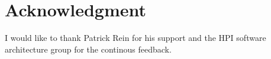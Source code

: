 \documentclass[10pt, conference]{IEEEtran}
\begin{document}




\section*{Acknowledgment}
I would like to thank Patrick Rein for his support and the HPI software architecture group for the continous feedback.


%
%
%
	




\end{document}
